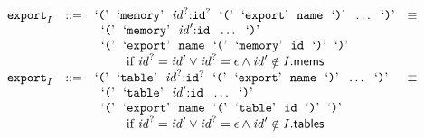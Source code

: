 $$\begin{array}[t]{@{}lrrl@{}l@{}l@{}l@{}}
{\begin{array}[t]{@{}l@{}l@{}l@{}}
{\begin{array}[t]{@{}l@{}}
\end{array}
} \\
\end{array}
} \\
& {{\mathtt{export}}}_{I} & ::= & \mbox{‘\texttt{{(}}’}~~\mbox{‘\texttt{memory}’}~~{{\mathit{id}}^?}{:}{{\mathtt{id}}^?}~~\mbox{‘\texttt{{(}}’}~~\mbox{‘\texttt{export}’}~~{\mathtt{name}}~~\mbox{‘\texttt{{)}}’}~~\ldots~~\mbox{‘\texttt{{)}}’} & \quad\equiv\quad{} & & \\
&&& \multicolumn{4}{@{}l@{}}{\quad
\begin{array}[t]{@{}l@{}l@{}l@{}}
\begin{array}[t]{@{}l@{}} \mbox{‘\texttt{{(}}’}~~\mbox{‘\texttt{memory}’}~~{\mathit{id}'}{:}{\mathtt{id}}~~\ldots~~\mbox{‘\texttt{{)}}’} \\
  \mbox{‘\texttt{{(}}’}~~\mbox{‘\texttt{export}’}~~{\mathtt{name}}~~\mbox{‘\texttt{{(}}’}~~\mbox{‘\texttt{memory}’}~~{\mathtt{id}}~~\mbox{‘\texttt{{)}}’}~~\mbox{‘\texttt{{)}}’} \end{array} & & \\
 \multicolumn{3}{@{}l@{}}{\quad
\begin{array}[t]{@{}l@{}}
\quad \mbox{if}~ {{\mathit{id}}^?} = {\mathit{id}'} \lor {{\mathit{id}}^?} = \epsilon \land {\mathit{id}'} \notin I{.}\mathsf{mems} \\
\end{array}
} \\
\end{array}
} \\
& {{\mathtt{export}}}_{I} & ::= & \mbox{‘\texttt{{(}}’}~~\mbox{‘\texttt{table}’}~~{{\mathit{id}}^?}{:}{{\mathtt{id}}^?}~~\mbox{‘\texttt{{(}}’}~~\mbox{‘\texttt{export}’}~~{\mathtt{name}}~~\mbox{‘\texttt{{)}}’}~~\ldots~~\mbox{‘\texttt{{)}}’} & \quad\equiv\quad{} & & \\
&&& \multicolumn{4}{@{}l@{}}{\quad
\begin{array}[t]{@{}l@{}l@{}l@{}}
\begin{array}[t]{@{}l@{}} \mbox{‘\texttt{{(}}’}~~\mbox{‘\texttt{table}’}~~{\mathit{id}'}{:}{\mathtt{id}}~~\ldots~~\mbox{‘\texttt{{)}}’} \\
  \mbox{‘\texttt{{(}}’}~~\mbox{‘\texttt{export}’}~~{\mathtt{name}}~~\mbox{‘\texttt{{(}}’}~~\mbox{‘\texttt{table}’}~~{\mathtt{id}}~~\mbox{‘\texttt{{)}}’}~~\mbox{‘\texttt{{)}}’} \end{array} & & \\
 \multicolumn{3}{@{}l@{}}{\quad
\begin{array}[t]{@{}l@{}}
\quad \mbox{if}~ {{\mathit{id}}^?} = {\mathit{id}'} \lor {{\mathit{id}}^?} = \epsilon \land {\mathit{id}'} \notin I{.}\mathsf{tables} \\

\end{array}}
\end{array}}
\end{array}$$
